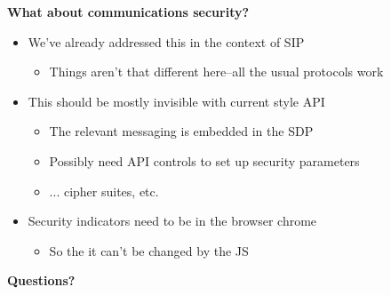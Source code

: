 \documentclass[helvetica]{seminar}
\newcommand{\heading}[1]{%
  \begin{center} 
    \large\bf 
    #1 
  \end{center} 
  \vspace{.4 in}}
\begin{document}
\begin{slide}
\heading{What about communications security?}

\begin{itemize}
\item We've already addressed this in the context of SIP
  \begin{itemize}
  \item Things aren't that different here--all the usual protocols work
  \end{itemize}

\item This should be mostly invisible with current style API
  \begin{itemize}
  \item The relevant messaging is embedded in the SDP
  \item Possibly need API controls to set up security parameters
  \item ... cipher suites, etc.
  \end{itemize}

\item Security indicators need to be in the browser chrome
  \begin{itemize}
  \item So the it can't be changed by the JS
  \end{itemize}

\end{itemize}

\end{slide}



\begin{slide}
\heading{Questions?}

\end{slide}



\begin{slide}

\scriptsize{


}
\end{slide}
\end{document}
